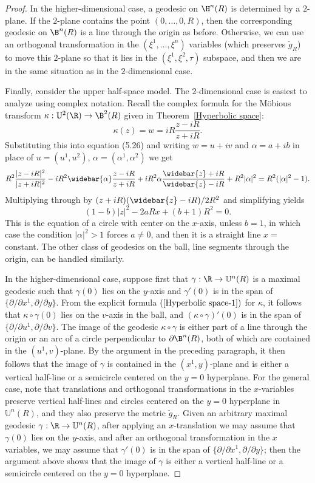 \begin{proof}
In the higher-dimensional case, a geodesic on $\H^n(R)$ is determined by a $2$-plane. If the $2$-plane contains the point $(0,\dots,0,R)$, then the corresponding geodesic on $\B^n(R)$ is a line through the origin as before. Otherwise, we can use an orthogonal transformation in the $(\xi^1,\dots,\xi^n)$ variables (which preserves $\breve{g}_R$) to move this $2$-plane so that it lies in the $(\xi^1,\xi^2,\tau)$ subspace, and then we are in the same situation as in the $2$-dimensional case.\par
Finally, consider the upper half-space model. The $2$-dimensional case is easiest to analyze using complex notation. Recall the complex formula for the M\"obious transform $\kappa:\mathbb{U}^2(\R)\to\B^2(R)$ given in Theorem~\ref{Hyperbolic space}:
\[\kappa(z)=w=iR\frac{z-iR}{z+iR}.\]
Substituting this into equation (5.26) and writing $w=u+iv$ and $\alpha=a+ib$ in place of $u=(u^1,u^2)$, $\alpha=(\alpha^1,\alpha^2)$ we get
\[R^2\frac{|z-iR|^2}{|z+iR|^2}-iR^2\widebar{\alpha}\frac{z-iR}{z+iR}+iR^2\alpha\frac{\widebar{z}+iR}{\widebar{z}-iR}+R^2|\alpha|^2=R^2(|\alpha|^2-1).\]
Multiplying through by $(z+iR)(\widebar{z}-iR)/2R^2$ and simplifying yields
\[(1-b)|z|^2-2aRx+(b+1)R^2=0.\]
This is the equation of a circle with center on the $x$-axis, unless $b=1$, in which case the condition $|\alpha|^2>1$ forces $a\neq 0$, and then it is a straight line $x=$ constant. The other class of geodesics on the ball, line segments through the origin, can be handled similarly.\par
In the higher-dimensional case, suppose first that $\gamma:\R\to\mathbb{U}^n(R)$ is a maximal geodesic such that $\gamma(0)$ lies on the $y$-axis and $\gamma'(0)$ is in the span of $\{\partial/\partial x^1,\partial/\partial y\}$. From the explicit formula $(\ref{Hyperbolic space-1})$ for $\kappa$, it follows that $\kappa\circ\gamma(0)$ lies on the $v$-axis 
in the ball, and $(\kappa\circ\gamma)'(0)$ is in the span of $\{\partial/\partial u^1,\partial/\partial v\}$. The image of the geodesic $\kappa\circ\gamma$ is either part of a line through the origin or an arc of a circle perpendicular to $\partial\B^n(R)$, both of which are contained in the $(u^1,v)$-plane. By the argument in the preceding paragraph, it then follows that the image of $\gamma$ is contained in the $(x^1,y)$-plane and is either a vertical half-line or a semicircle centered on the $y=0$ hyperplane. For the general case, note that translations and orthogonal transformations in the $x$-variables preserve vertical half-lines and circles centered on the $y=0$ hyperplane in $\mathbb{U}^n(R)$, and they also preserve the metric $\breve{g}_R$. Given an arbitrary maximal geodesic $\gamma:\R\to\mathbb{U}^n(R)$, after applying an $x$-translation we may assume that $\gamma(0)$ lies on the $y$-axis, and after an orthogonal transformation in the $x$ variables, we may assume that $\gamma'(0)$ is in the span of $\{\partial/\partial x^1,\partial/\partial y\}$; then the argument above shows that the image of $\gamma$ is either a vertical half-line or a semicircle centered on the $y=0$ hyperplane.
\end{proof}
